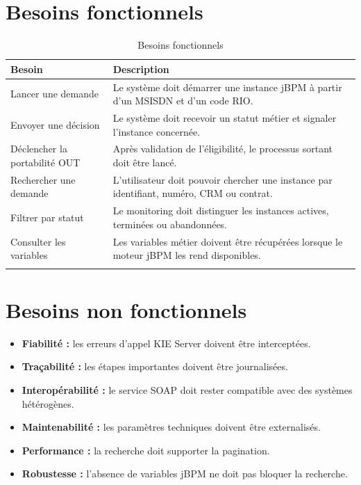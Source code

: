 \documentclass[12pt,a4paper]{report}
\begin{document}
\section{Besoins fonctionnels}
\begin{longtable}{p{4cm}p{9cm}}
    \toprule
    \textbf{Besoin} & \textbf{Description} \\
    \midrule
    \endhead
    Lancer une demande & Le système doit démarrer une instance jBPM à partir d'un MSISDN et d'un code RIO. \\
    Envoyer une décision & Le système doit recevoir un statut métier et signaler l'instance concernée. \\
    Déclencher la portabilité OUT & Après validation de l'éligibilité, le processus sortant doit être lancé. \\
    Rechercher une demande & L'utilisateur doit pouvoir chercher une instance par identifiant, numéro, CRM ou contrat. \\
    Filtrer par statut & Le monitoring doit distinguer les instances actives, terminées ou abandonnées. \\
    Consulter les variables & Les variables métier doivent être récupérées lorsque le moteur jBPM les rend disponibles. \\
    \bottomrule
    \caption{Besoins fonctionnels}
\end{longtable}

\section{Besoins non fonctionnels}
\begin{itemize}
    \item \textbf{Fiabilité :} les erreurs d'appel KIE Server doivent être interceptées.
    \item \textbf{Traçabilité :} les étapes importantes doivent être journalisées.
    \item \textbf{Interopérabilité :} le service SOAP doit rester compatible avec des systèmes hétérogènes.
    \item \textbf{Maintenabilité :} les paramètres techniques doivent être externalisés.
    \item \textbf{Performance :} la recherche doit supporter la pagination.
    \item \textbf{Robustesse :} l'absence de variables jBPM ne doit pas bloquer la recherche.
\end{itemize}
\end{document}
